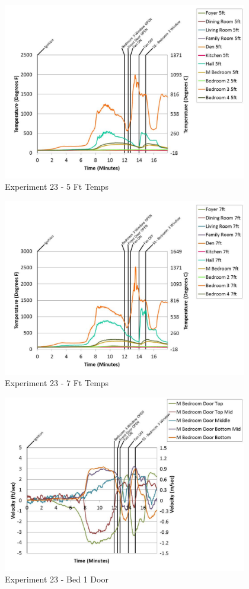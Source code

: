 \documentclass{article}
\begin{document}
\begin{appendices}
	\begin{figure}[h!]
		\centering
		\includegraphics[height=3.05in]{0_Images/Results_Charts/Exp_23_Charts/5FtTemps.pdf}
		\caption{Experiment 23 - 5 Ft Temps}
	\end{figure}
 

	\begin{figure}[h!]
		\centering
		\includegraphics[height=3.05in]{0_Images/Results_Charts/Exp_23_Charts/7FtTemps.pdf}
		\caption{Experiment 23 - 7 Ft Temps}
	\end{figure}
 
	\clearpage

	\begin{figure}[h!]
		\centering
		\includegraphics[height=3.05in]{0_Images/Results_Charts/Exp_23_Charts/Bed1Door.pdf}
		\caption{Experiment 23 - Bed 1 Door}
	\end{figure}
 


\end{appendices}
\end{document}
